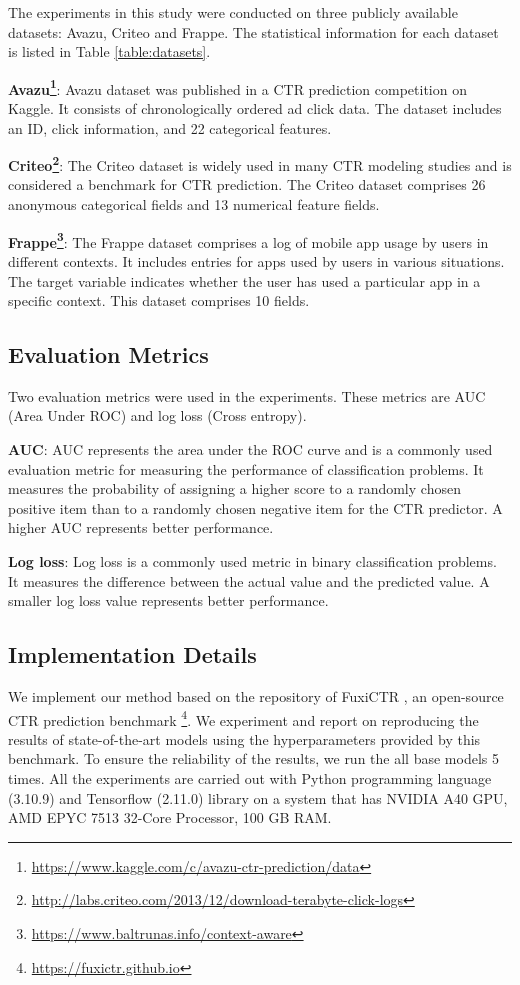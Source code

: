 \documentclass{article}
\begin{document}
The experiments in this study were conducted on three publicly available datasets: Avazu, Criteo and Frappe. The statistical information for each dataset is listed in Table \ref{table:datasets}.

\textbf{Avazu\footnote{\url{https://www.kaggle.com/c/avazu-ctr-prediction/data}}}: Avazu dataset was published in a CTR prediction competition on Kaggle. It consists of chronologically ordered ad click data. The dataset includes an ID, click information, and 22 categorical features.

\textbf{Criteo\footnote{\url{http://labs.criteo.com/2013/12/download-terabyte-click-logs}}}: The Criteo dataset is widely used in many CTR modeling studies and is considered a benchmark for CTR prediction. The Criteo dataset comprises 26 anonymous categorical fields and 13 numerical feature fields.

\textbf{Frappe\footnote{\url{https://www.baltrunas.info/context-aware}}}: The Frappe dataset comprises a log of mobile app usage by users in different contexts. It includes entries for apps used by users in various situations. The target variable indicates whether the user has used a particular app in a specific context. This dataset comprises 10 fields.

\subsection{Evaluation Metrics}

Two evaluation metrics were used in the experiments. These metrics are AUC (Area Under ROC) and log loss (Cross entropy).

\textbf{AUC}: AUC represents the area under the ROC curve and is a commonly used evaluation metric for measuring the performance of classification problems. It measures the probability of assigning a higher score to a randomly chosen positive item than to a randomly chosen negative item for the CTR predictor. A higher AUC represents better performance.

\textbf{Log loss}: Log loss is a commonly used metric in binary classification problems. It measures the difference between the actual value and the predicted value. A smaller log loss value represents better performance.





\subsection{Implementation Details}
We implement our method based on the repository of FuxiCTR \cite{zhu2021open}, an open-source CTR prediction benchmark \footnote{\url{https://fuxictr.github.io}}. We experiment and report on reproducing the results of state-of-the-art models using the hyperparameters provided by this benchmark. To ensure the reliability of the results, we run the all base models 5 times. All the experiments are carried out with Python programming language (3.10.9) and Tensorflow (2.11.0) library on a system that has NVIDIA A40 GPU, AMD EPYC 7513 32-Core Processor, 100 GB RAM. 
\end{document}
